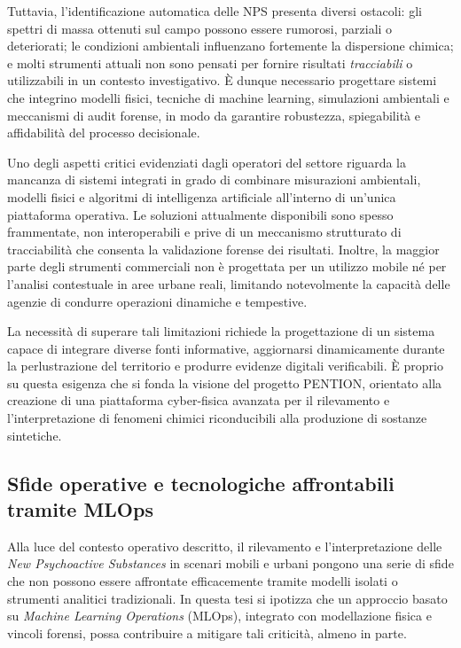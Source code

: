 Tuttavia, l’identificazione automatica delle NPS presenta diversi ostacoli: gli spettri di massa ottenuti sul campo possono essere rumorosi, parziali o deteriorati; le condizioni ambientali influenzano fortemente la dispersione chimica; e molti strumenti attuali non sono pensati per fornire risultati \textit{tracciabili} o utilizzabili in un contesto investigativo.
È dunque necessario progettare sistemi che integrino modelli fisici, tecniche di machine learning, simulazioni ambientali e meccanismi di audit forense, in modo da garantire robustezza, spiegabilità e affidabilità del processo decisionale.

Uno degli aspetti critici evidenziati dagli operatori del settore riguarda la mancanza di sistemi integrati in grado di combinare misurazioni ambientali, modelli fisici e algoritmi di intelligenza artificiale all'interno di un'unica piattaforma operativa. Le soluzioni attualmente disponibili sono spesso frammentate, non interoperabili e prive di un meccanismo strutturato di tracciabilità che consenta la validazione forense dei risultati. Inoltre, la maggior parte degli strumenti commerciali non è progettata per un utilizzo mobile né per l’analisi contestuale in aree urbane reali, limitando notevolmente la capacità delle agenzie di condurre operazioni dinamiche e tempestive.

La necessità di superare tali limitazioni richiede la progettazione di un sistema capace di integrare diverse fonti informative, aggiornarsi dinamicamente durante la perlustrazione del territorio e produrre evidenze digitali verificabili. È proprio su questa esigenza che si fonda la visione del progetto \textsc{PENTION}, orientato alla creazione di una piattaforma cyber-fisica avanzata per il rilevamento e l’interpretazione di fenomeni chimici riconducibili alla produzione di sostanze sintetiche.

\subsection{Sfide operative e tecnologiche affrontabili tramite MLOps}
\label{sec:mlops_challenges}

Alla luce del contesto operativo descritto, il rilevamento e l’interpretazione delle \emph{New Psychoactive Substances} in scenari mobili e urbani pongono una serie di sfide che non possono essere affrontate efficacemente tramite modelli isolati o strumenti analitici tradizionali.
In questa tesi si ipotizza che un approccio basato su \emph{Machine Learning Operations} (MLOps), integrato con modellazione fisica e vincoli forensi, possa contribuire a mitigare tali criticità, almeno in parte.

